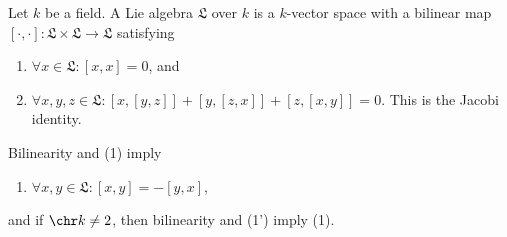 Let $k$ be a field. A Lie algebra $\mathfrak{L}$ over $k$ is a $k$-vector space with
a bilinear map $[\cdot, \cdot]\colon \mathfrak{L}\times \mathfrak{L}\to \mathfrak{L}$ satisfying
\begin{enumerate}[label=(\arabic*)]
	\item $\forall x \in \mathfrak{L}\colon [x, x] = 0$, and
	\item $\forall x, y, z \in \mathfrak{L}\colon [x, [y, z]] + [y, [z, x]] + [z, [x, y]] = 0$.
		This is the Jacobi identity.
\end{enumerate}

Bilinearity and (1) imply
\begin{enumerate}[label=(\arabic*')]
	\item $\forall x, y \in \mathfrak{L}\colon [x, y] = -[y, x]$,
\end{enumerate}
and if $\chr k \neq 2$, then bilinearity and (1') imply (1).
